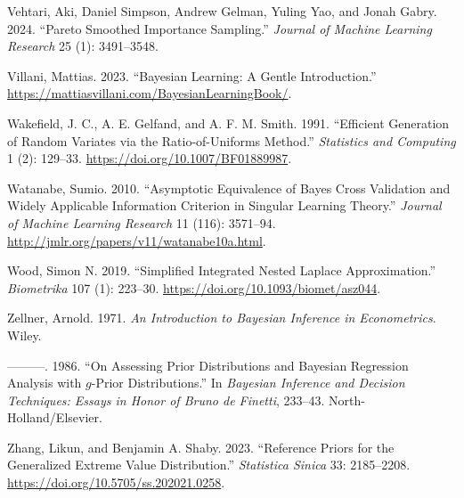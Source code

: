 \documentclass[
  11pt,
  letterpaper,
]{scrbook}
\newlength{\cslhangindent}
\newenvironment{CSLReferences}[2] %
 {\begin{list}{}{%
  \setlength{\itemindent}{0pt}
  \setlength{\leftmargin}{0pt}
  \setlength{\parsep}{0pt}
  \ifodd #1
   \setlength{\leftmargin}{\cslhangindent}
   \setlength{\itemindent}{-1\cslhangindent}
  \fi
  \setlength{\itemsep}{#2\baselineskip}}}
 {\end{list}}
\theoremstyle{plain}
\theoremstyle{plain}
\theoremstyle{definition}
\theoremstyle{definition}
\theoremstyle{definition}
\theoremstyle{plain}
\theoremstyle{remark}
\begin{document}
\begin{CSLReferences}{1}{0}
Vehtari, Aki, Daniel Simpson, Andrew Gelman, Yuling Yao, and Jonah
Gabry. 2024. {``Pareto Smoothed Importance Sampling.''} \emph{Journal of
Machine Learning Research} 25 (1): 3491--3548.

Villani, Mattias. 2023. {``Bayesian Learning: A Gentle Introduction.''}
\url{https://mattiasvillani.com/BayesianLearningBook/}.

Wakefield, J. C., A. E. Gelfand, and A. F. M. Smith. 1991. {``Efficient
Generation of Random Variates via the Ratio-of-Uniforms Method.''}
\emph{Statistics and Computing} 1 (2): 129--33.
\url{https://doi.org/10.1007/BF01889987}.

Watanabe, Sumio. 2010. {``Asymptotic Equivalence of {B}ayes Cross
Validation and Widely Applicable Information Criterion in Singular
Learning Theory.''} \emph{Journal of Machine Learning Research} 11
(116): 3571--94. \url{http://jmlr.org/papers/v11/watanabe10a.html}.

Wood, Simon N. 2019. {``Simplified Integrated Nested {L}aplace
Approximation.''} \emph{Biometrika} 107 (1): 223--30.
\url{https://doi.org/10.1093/biomet/asz044}.

Zellner, Arnold. 1971. \emph{An Introduction to {B}ayesian Inference in
Econometrics}. Wiley.

---------. 1986. {``On Assessing Prior Distributions and {B}ayesian
Regression Analysis with \(g\)-Prior Distributions.''} In
\emph{{B}ayesian Inference and Decision Techniques: Essays in Honor of
{B}runo de {F}inetti}, 233--43. North-Holland/Elsevier.

Zhang, Likun, and Benjamin A. Shaby. 2023. {``Reference Priors for the
Generalized Extreme Value Distribution.''} \emph{Statistica Sinica} 33:
2185--2208. \url{https://doi.org/10.5705/ss.202021.0258}.

\end{CSLReferences}


\backmatter
\end{document}

